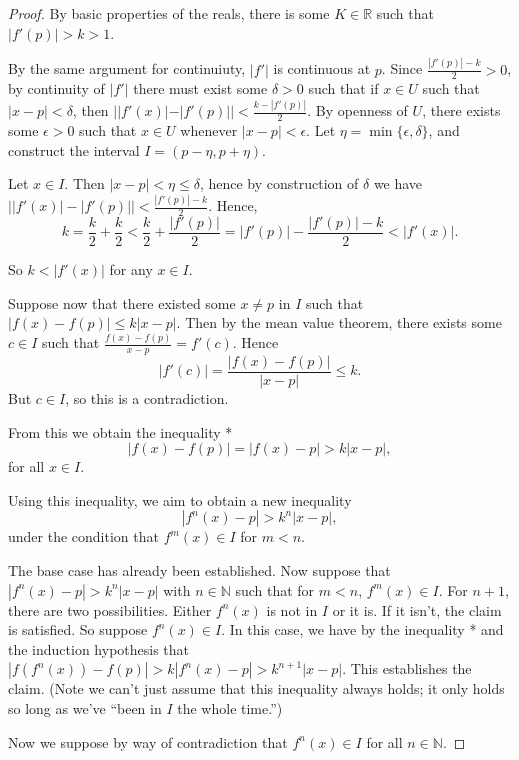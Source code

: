 \documentclass[12pt, letterpaper]{article}
\newcommand{\R}{\mathbb{R}}
\newcommand{\N}{\mathbb{N}}
\theoremstyle{definition}
\begin{document}
\begin{proof}
    By basic properties of the reals, there is some $K\in \R$ such that $ |f'(p)| > k > 1 $. 

    By the same argument for continuiuty, $|f'|$ is continuous at $p$. Since $\frac{|f'(p)| - k}{2} > 0$, by continuity of $ |f'| $ there must 
    exist some $ \delta > 0 $ such that if $ x\in U $ such that $ | x - p | < \delta $, then $ | |f'(x)| - |f'(p)| | < \frac{k - |f'(p)|}{2}. $
    By openness of $U$, there exists some $\epsilon > 0$ such that $ x\in U $ whenever $ |x - p| < \epsilon $. Let $\eta = \min\{\epsilon, \delta\}$,
    and construct the interval $ I = (p - \eta, p+ \eta) $.

    Let $x\in I$. Then $|x - p| < \eta \le \delta$, hence by construction of $\delta$ we have $ \left||f'(x)| - |f'(p)| \right| < \frac{|f'(p)| - k}{2} $.
    Hence,
    \[
        k = \frac{k}{2} + \frac{k}{2} < \frac{k}{2} + \frac{|f'(p)|}{2} = |f'(p)| -\frac{|f'(p)| - k}{2} < |f'(x)|.
        \]

    So $k < |f'(x)|$ for any $x\in I$.
 
    Suppose now that there existed some $ x\ne p $ in $I$ such that $ |f(x) - f(p)|\le k|x-p| $. 
    Then by the mean value theorem, there exists some 
    $c \in I$ such that $ \frac{f(x) - f(p)}{x-p} = f'(c) $. Hence 
    \[
        |f'(c)| = \frac{|f(x) - f(p)|}{|x - p|} \le k.
        \]
    But $c\in I$, so this is a contradiction.

    From this we obtain the inequality *
    \[
        |f(x) - f(p)| = |f(x) - p| > k|x-p|,
        \]
    for all $x\in I$.

    Using this inequality, we aim to obtain a new inequality
    \[
        |f^n(x) - p| > k^n |x-p|,
        \]
    under the condition that $ f^m(x)\in I $ for $m < n$. 

    The base case has already been established. Now suppose that $|f^n(x) - p| > k^n|x-p|$ with $n\in \N$ such that for $ m<n $, $f^m(x)\in I$. 
    For $n + 1$, there are two possibilities. Either $f^n(x)$ is not in $ I $ or it is. If it isn't, the claim is satisfied.
    So suppose $ f^n(x) \in I $. In this case, we have by the inequality * and the induction hypothesis that $ |f(f^n(x)) - f(p)| > k|f^n(x) - p| >  k^{n+1}|x-p|$.
    This establishes the claim. (Note we can't just assume that this inequality always holds; it only holds so long as we've ``been in $I$ the whole time.'')

    Now we suppose by way of contradiction that $f^n(x)\in I$ for all $n\in \N$. 



\end{proof}
\end{document}
